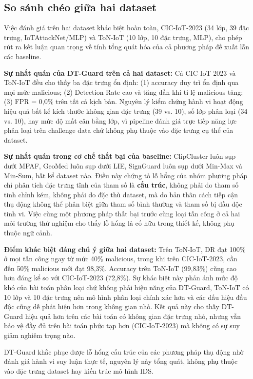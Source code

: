 \subsection{So sánh chéo giữa hai dataset}
Việc đánh giá trên hai dataset khác biệt hoàn toàn, CIC-IoT-2023 (34 lớp, 39 đặc trưng, IoTAttackNet/MLP) và ToN-IoT (10 lớp, 10 đặc trưng, MLP), cho phép rút ra kết luận quan trọng về tính tổng quát hóa của cả phương pháp đề xuất lẫn các baseline.

\textbf{Sự nhất quán của DT-Guard trên cả hai dataset:} Cả CIC-IoT-2023 và ToN-IoT đều cho thấy ba đặc trưng ổn định: (1) accuracy duy trì ổn định qua mọi mức malicious; (2) Detection Rate cao và tăng dần khi tỉ lệ malicious tăng; (3) FPR = 0,0\% trên tất cả kịch bản. Nguyên lý kiểm chứng hành vi hoạt động hiệu quả bất kể kích thước không gian đặc trưng (39 vs. 10), số lớp phân loại (34 vs. 10), hay mức độ mất cân bằng lớp, vì pipeline đánh giá trực tiếp năng lực phân loại trên challenge data chứ không phụ thuộc vào đặc trưng cụ thể của dataset.

\textbf{Sự nhất quán trong cơ chế thất bại của baseline:} ClipCluster luôn sụp dưới MPAF, GeoMed luôn sụp dưới LIE, SignGuard luôn sụp dưới Min-Max và Min-Sum, bất kể dataset nào. Điều này chứng tỏ lỗ hổng của nhóm phương pháp chỉ phân tích đặc trưng tĩnh của tham số là \textbf{cấu trúc}, không phải do tham số tinh chỉnh kém, không phải do đặc thù dataset, mà do bản thân cách tiếp cận thụ động không thể phân biệt giữa tham số bình thường và tham số bị đầu độc tinh vi. Việc cùng một phương pháp thất bại trước cùng loại tấn công ở cả hai môi trường thử nghiệm cho thấy lỗ hổng là cố hữu trong thiết kế, không phụ thuộc ngữ cảnh.

\textbf{Điểm khác biệt đáng chú ý giữa hai dataset:} Trên ToN-IoT, DR đạt 100\% ở mọi tấn công ngay từ mức 40\% malicious, trong khi trên CIC-IoT-2023, cần đến 50\% malicious mới đạt 98,3\%. Accuracy trên ToN-IoT (99,83\%) cũng cao hơn đáng kể so với CIC-IoT-2023 (72,8\%). Sự khác biệt này phản ánh mức độ khó của bài toán phân loại chứ không phải hiệu năng của DT-Guard, ToN-IoT có 10 lớp và 10 đặc trưng nên mô hình phân loại chính xác hơn và các dấu hiệu đầu độc cũng dễ phát hiện hơn trong không gian nhỏ. Kết quả này cho thấy DT-Guard hiệu quả hơn trên các bài toán có không gian đặc trưng nhỏ, nhưng vẫn bảo vệ đầy đủ trên bài toán phức tạp hơn (CIC-IoT-2023) mà không có sự suy giảm nghiêm trọng nào.

DT-Guard khắc phục được lỗ hổng cấu trúc của các phương pháp thụ động nhờ đánh giá hành vi suy luận thực tế, nguyên lý này tổng quát, không phụ thuộc vào đặc trưng dataset hay kiến trúc mô hình IDS.

